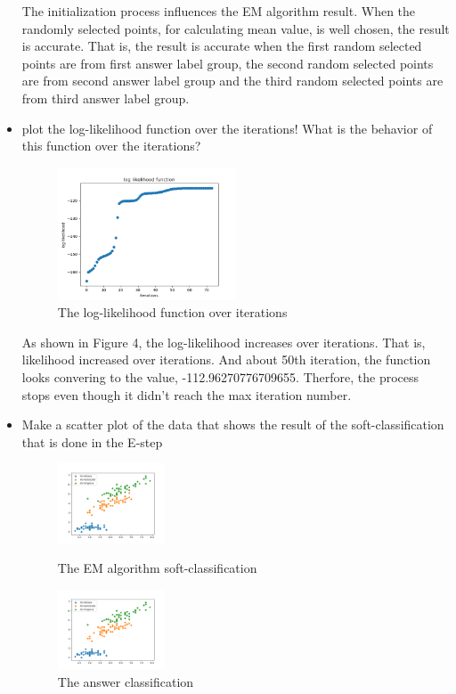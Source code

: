 \documentclass[a4paper]{article}
\begin{document}
\begin{itemize}
	The initialization process influences the EM algorithm result. When the randomly selected points, for calculating mean value, is well chosen, the result is accurate. That is, the result is accurate when the first random selected points are from first answer label group, the second random selected points are from second answer label group and the third random selected points are from third answer label group.
	
	\clearpage
	\item plot the log-likelihood function over the iterations! What is the behavior of this function over the iterations?
	
	\begin{figure}[h]
		\begin{center}
			\includegraphics[width=0.5\textwidth]{log_likelihood.png}
			\caption{The log-likelihood function over iterations}
		\end{center}
	\end{figure}
	As shown in Figure 4, the log-likelihood increases over iterations. That is, likelihood increased over iterations. And about 50th iteration, the function looks convering to the value, -112.96270776709655. Therfore, the process stops even though it didn't reach the max iteration number.\\

	\item Make a scatter plot of the data that shows the result of the soft-classiﬁcation that is done in the E-step
	
	\begin{figure}[h]
		\begin{center}
			\includegraphics[width=0.3\textwidth]{3class.png}
			\caption{The EM algorithm soft-classification}
			\includegraphics[width=0.3\textwidth]{answer.png}
			\caption{The answer classification}
		\end{center}
	\end{figure}
	

\end{itemize}
\end{document}
